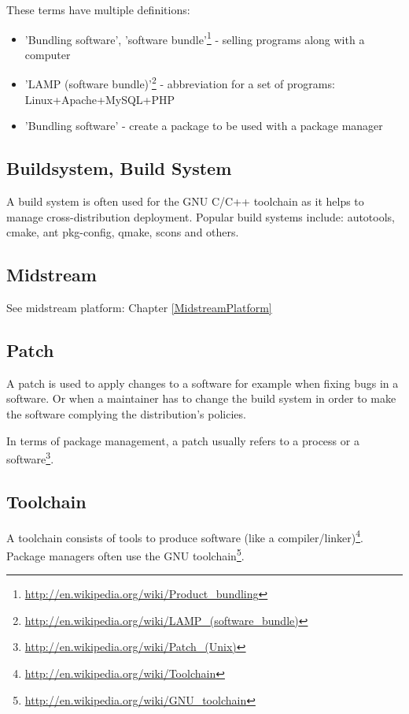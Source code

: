 \documentclass[a4paper,10pt]{article}
\begin{document}
These terms have multiple definitions:
\begin{itemize}
\item 'Bundling software', 'software bundle'\footnote{\url{http://en.wikipedia.org/wiki/Product_bundling}} - selling programs along with a computer
\item 'LAMP (software bundle)'\footnote{\url{http://en.wikipedia.org/wiki/LAMP_(software_bundle)}} - abbreviation for a set of programs: Linux+Apache+MySQL+PHP
\item 'Bundling software' - create a package to be used with a package manager
\end{itemize}





\subsection{Buildsystem, Build System}
A build system is often used for the GNU C/C++ toolchain as it helps to manage cross-distribution deployment. Popular build systems include: autotools, cmake, ant pkg-config, qmake, scons and others.









\subsection{Midstream}
See midstream platform: Chapter \ref{MidstreamPlatform}





\subsection{Patch}
A patch is used to apply changes to a software for example when fixing bugs in a software. Or when a maintainer has to change the build system in order to make the software complying the distribution's policies.

In terms of package management, a patch usually refers to a process or a software\footnote{\url{http://en.wikipedia.org/wiki/Patch_(Unix)}}.






\subsection{Toolchain}
A toolchain consists of tools to produce software (like a compiler/linker)\footnote{\url{http://en.wikipedia.org/wiki/Toolchain}}. Package managers often use the GNU toolchain\footnote{\url{http://en.wikipedia.org/wiki/GNU_toolchain}}.
\end{document}
